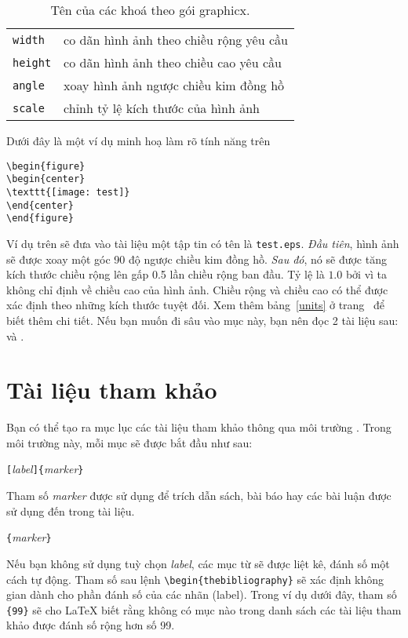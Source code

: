 \begin{table}[!htb]
\caption{Tên của các khoá theo gói \textsf{graphicx}.}
\label{keyvals}
\begin{lined}{9cm}
\begin{tabular}{@{}ll}
\texttt{width}& co dãn hình ảnh theo chiều rộng yêu cầu\\
\texttt{height}& co dãn hình ảnh theo chiều cao yêu cầu\\
\texttt{angle}& xoay hình ảnh ngược chiều kim đồng hồ\\
\texttt{scale}& chỉnh tỷ lệ kích thước của hình ảnh \\
\end{tabular}

\bigskip
\end{lined}
\end{table}

\pagebreak
Dưới đây là một ví dụ minh hoạ làm rõ tính năng trên
\begin{code}
\begin{verbatim}
\begin{figure}
\begin{center}
\texttt{[image: test]}
\end{center}
\end{figure}
\end{verbatim}
\end{code}
Ví dụ trên sẽ đưa vào tài liệu một tập tin có tên là \texttt{test.eps}. \emph{Đầu tiên}, hình ảnh sẽ được xoay một góc
90 độ ngược chiều kim đồng hồ. \emph{Sau đó}, nó sẽ được tăng kích thước chiều rộng lên gấp 0.5 lần chiều rộng ban đầu. Tỷ lệ là $1.0$ bởi vì ta không chỉ định về chiều cao của hình ảnh. Chiều rộng và chiều cao có thể được xác định theo những kích thước tuyệt đối. Xem thêm bảng~\ref{units} ở trang~\pageref{units} để biết thêm chi tiết. Nếu bạn muốn đi sâu vào mục này, bạn nên đọc 2 tài liệu sau: \cite{graphics} và .

\section{Tài liệu tham khảo}
Bạn có thể tạo ra mục lục các tài liệu tham khảo thông qua môi trường . Trong môi trường này, mỗi mục sẽ được bắt đầu như sau:
\begin{lscommand}
\verb|[|\emph{label}\verb|]{|\emph{marker}\verb|}|
\end{lscommand}
Tham số \emph{marker} được sử dụng để trích dẫn sách, bài báo hay các bài luận được sử dụng đến trong tài liệu.
\begin{lscommand}
\verb|{|\emph{marker}\verb|}|
\end{lscommand}
Nếu bạn không sử dụng tuỳ chọn \emph{label}, các mục từ sẽ được liệt kê, đánh số một cách tự động. Tham số sau lệnh \verb|\begin{thebibliography}| sẽ xác định không gian dành cho phần đánh số của các nhãn (label). Trong ví dụ dưới đây, tham số \verb|{99}| sẽ cho \LaTeX{} biết rằng không có mục nào trong danh sách các tài liệu tham khảo được đánh số rộng hơn số 99.

